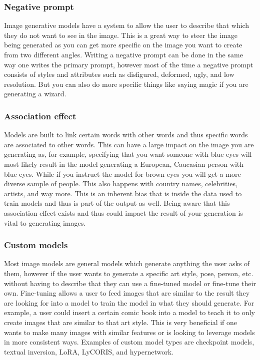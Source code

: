 \subsubsection*{Negative prompt}
Image generative models have a system to allow the user to describe that which they do not want to see in the image. This is a great way to steer the image being generated as you can get more specific on the image you want to create from two different angles. Writing a negative prompt can be done in the same way one writes the primary prompt, however most of the time a negative prompt consists of styles and attributes such as disfigured, deformed, ugly, and low resolution. But you can also do more specific things like saying magic if you are generating a wizard.
\subsubsection*{Association effect}
Models are built to link certain words with other words and thus specific words are associated to other words. This can have a large impact on the image you are generating as, for example, specifying that you want someone with blue eyes will most likely result in the model generating a European, Caucasian person with blue eyes. While if you instruct the model for brown eyes you will get a more diverse sample of people. This also happens with country names, celebrities, artists, and way more. This is an inherent bias that is inside the data used to train models and thus is part of the output as well. Being aware that this association effect exists and thus could impact the result of your generation is vital to generating images.
\subsubsection*{Custom models}
Most image models are general models which generate anything the user asks of them, however if the user wants to generate a specific art style, pose, person, etc. without having to describe that they can use a fine-tuned model or fine-tune their own. Fine-tuning allows a user to feed images that are similar to the result they are looking for into a model to train the model in what they should generate. For example, a user could insert a certain comic book into a model to teach it to only create images that are similar to that art style. This is very beneficial if one wants to make many images with similar features or is looking to leverage models in more consistent ways. Examples of custom model types are checkpoint models, textual inversion, LoRA, LyCORIS, and hypernetwork.
